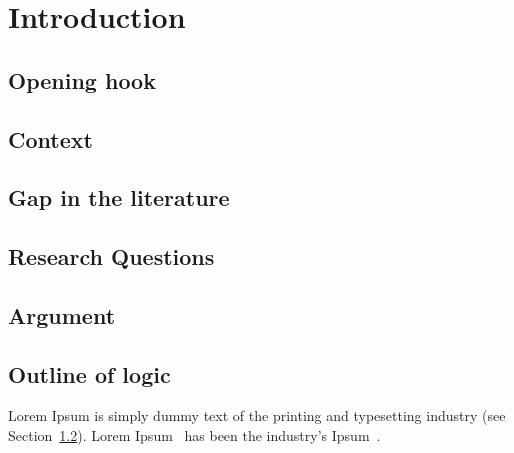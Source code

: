 
\chapter{Introduction}  %

\ifpdf
    \graphicspath{{Chapter1/Figs/Raster/}{Chapter1/Figs/PDF/}{Chapter1/Figs/}}
\else
    \graphicspath{{Chapter1/Figs/Vector/}{Chapter1/Figs/}}
\fi


\section{Opening hook}

\section{Context} %
\label{section1.1}

\section{Gap in the literature}
\section{Research Questions}
\section{Argument}

\section{Outline of logic}
Lorem Ipsum is simply dummy text of the printing and typesetting industry (see
Section~\ref{section1.1}). Lorem Ipsum~\citep{Aup91} has been the industry's
Ipsum~\citep{AAB95,Con90,LM65}.
